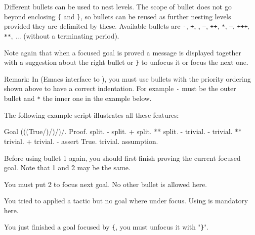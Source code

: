 Different bullets can be used to nest levels. The scope of bullet does
not go beyond enclosing {\tt \{} and {\tt \}}, so bullets can be
reused as further nesting levels provided they are delimited by these.
Available bullets are {\tt -}, {\tt +}, {\tt *}, {\tt --}, {\tt ++}, {\tt **},
{\tt ---}, {\tt +++}, {\tt ***}, ... (without a
terminating period).

Note again that when a focused goal is proved a message is displayed
together with a suggestion about the right bullet or {\tt \}} to
unfocus it or focus the next one.

Remark: In {\ProofGeneral} (Emacs interface to {\Coq}), you must use
bullets with the priority ordering shown above to have a correct
indentation. For example {\tt -} must be the outer bullet and {\tt **}
the inner one in the example below.

The following example script illustrates all these features:
\begin{coq_example*}
Goal (((True/\True)/\True)/\True)/\True.
Proof.
  split.
  - split.
    + split.
      ** { split.
          - trivial.
          - trivial.
        }
      ** trivial.
    + trivial.
  - assert True.
    { trivial. }
    assumption.
\end{coq_example*}


\begin{ErrMsgs}
\item {}

  Before using bullet {\abullet}1 again, you should first finish
  proving the current focused goal. Note that {\abullet}1 and
  {\abullet}2 may be the same.

\item {} You must put {\abullet}2 to focus next goal.
  No other bullet is allowed here.


\item {}

  You tried to applied a tactic but no goal where under focus. Using
  {\abullet} is mandatory here.

\item {} You
  just finished a goal focused by {\tt \{}, you must unfocus it with "{\tt \}}".

\end{ErrMsgs}

